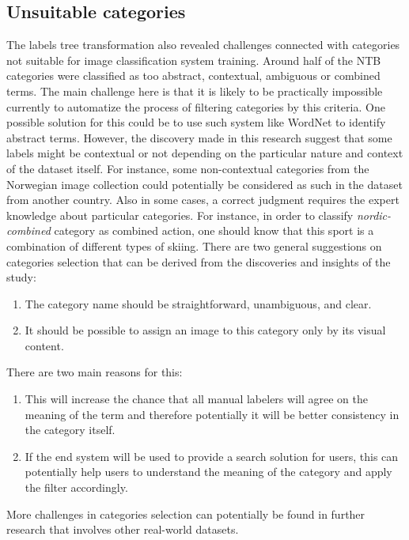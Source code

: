 \subsection{Unsuitable categories}
The labels tree transformation also revealed challenges connected with categories not suitable for image classification system training. Around half of the NTB categories were classified as too abstract, contextual, ambiguous or combined terms. The main challenge here is that it is likely to be practically impossible currently to automatize the process of filtering categories by this criteria. One possible solution for this could be to use such system like WordNet to identify abstract terms. However, the discovery made in this research suggest that some labels might be contextual or not depending on the particular nature and context of the dataset itself. For instance, some non-contextual categories from the Norwegian image collection could potentially be considered as such in the dataset from another country. Also in some cases, a correct judgment requires the expert knowledge about particular categories. For instance, in order to classify \textit{nordic-combined} category as combined action, one should know that this sport is a combination of different types of skiing. There are two general suggestions on categories selection that can be derived from the discoveries and insights of the study:

\begin{enumerate}
    \item The category name should be straightforward, unambiguous, and clear.
    \item It should be possible to assign an image to this category only by its visual content.
\end{enumerate}

There are two main reasons for this:

\begin{enumerate}
    \item This will increase the chance that all manual labelers will agree on the meaning of the term and therefore potentially it will be better consistency in the category itself.
    \item If the end system will be used to provide a search solution for users, this can potentially help users to understand the meaning of the category and apply the filter accordingly.
\end{enumerate}

More challenges in categories selection can potentially be found in further research that involves other real-world datasets.

